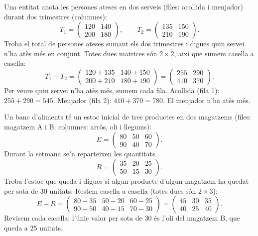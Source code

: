 \begin{exresolt}
Una entitat anota les persones ateses en dos serveis (files: acollida i menjador)
durant dos trimestres (columnes):
\[
T_1=\begin{pmatrix} 120 & 140 \\ 200 & 180 \end{pmatrix},\qquad
T_2=\begin{pmatrix} 135 & 150 \\ 210 & 190 \end{pmatrix}.
\]
Troba el total de persones ateses sumant els dos trimestres i digues quin servei
n'ha atès més en conjunt.
\solucio
Totes dues matrices són $2\times 2$, així que sumem casella a casella:
\[
T_1+T_2=\begin{pmatrix} 120+135 & 140+150 \\ 200+210 & 180+190 \end{pmatrix}
       =\begin{pmatrix} 255 & 290 \\ 410 & 370 \end{pmatrix}.
\]
Per veure quin servei n'ha atès més, sumem cada fila. Acollida (fila 1):
$255 + 290 = 545$. Menjador (fila 2): $410 + 370 = 780$. El menjador n'ha atès més.
\end{exresolt}

\begin{exresolt}
Un banc d'aliments té un estoc inicial de tres productes en dos magatzems
(files: magatzem A i B; columnes: arròs, oli i llegums):
\[
E=\begin{pmatrix} 80 & 50 & 60 \\ 90 & 40 & 70 \end{pmatrix}.
\]
Durant la setmana se'n reparteixen les quantitats
\[
R=\begin{pmatrix} 35 & 20 & 25 \\ 50 & 15 & 30 \end{pmatrix}.
\]
Troba l'estoc que queda i digues si algun producte d'algun magatzem ha quedat per
sota de $30$ unitats.
\solucio
Restem casella a casella (totes dues són $2\times 3$):
\[
E-R=\begin{pmatrix} 80-35 & 50-20 & 60-25 \\ 90-50 & 40-15 & 70-30 \end{pmatrix}
   =\begin{pmatrix} 45 & 30 & 35 \\ 40 & 25 & 40 \end{pmatrix}.
\]
Revisem cada casella: l'únic valor per sota de $30$ és l'oli del magatzem B,
que queda a $25$ unitats.
\end{exresolt}

